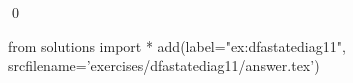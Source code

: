 
\begin{ex} 
  \label{ex:dfastatediag11}
  
  \qed
\end{ex} 
\begin{python0}
from solutions import *
add(label="ex:dfastatediag11",
    srcfilename='exercises/dfastatediag11/answer.tex') 
\end{python0}
